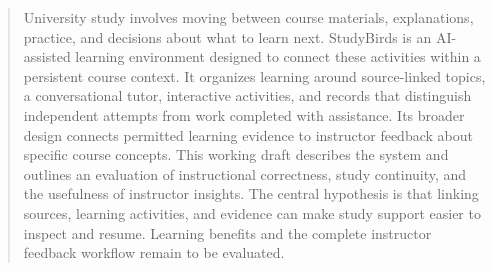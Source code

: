\begin{abstract}
University study involves moving between course materials, explanations,
practice, and decisions about what to learn next. StudyBirds is an
AI-assisted learning environment designed to connect these activities
within a persistent course context. It organizes learning around
source-linked topics, a conversational tutor, interactive activities,
and records that distinguish independent attempts from work completed
with assistance. Its broader design connects permitted learning evidence
to instructor feedback about specific course concepts. This working
draft describes the system and outlines an evaluation of instructional
correctness, study continuity, and the usefulness of instructor insights.
The central hypothesis is that linking sources, learning activities,
and evidence can make study support easier to inspect and resume.
Learning benefits and the complete instructor feedback workflow remain
to be evaluated.
\end{abstract}
